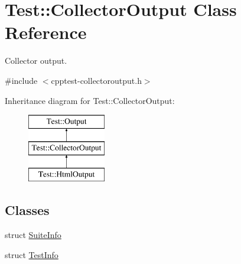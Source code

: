 \hypertarget{class_test_1_1_collector_output}{}\section{Test\+:\+:Collector\+Output Class Reference}
\label{class_test_1_1_collector_output}


Collector output.  




{\ttfamily \#include $<$cpptest-\/collectoroutput.\+h$>$}

Inheritance diagram for Test\+:\+:Collector\+Output\+:\begin{figure}[H]
\begin{center}
\leavevmode
\includegraphics[height=3.000000cm]{class_test_1_1_collector_output}
\end{center}
\end{figure}
\subsection*{Classes}
\begin{DoxyCompactItemize}
\item 
struct \mbox{\hyperlink{struct_test_1_1_collector_output_1_1_suite_info}{Suite\+Info}}
\item 
struct \mbox{\hyperlink{struct_test_1_1_collector_output_1_1_test_info}{Test\+Info}}
\end{DoxyCompactItemize}
